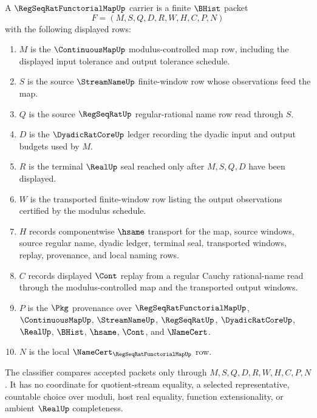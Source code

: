\begin{definition}
\label{def:regseqrat-functorial-map-carrier}
A $\RegSeqRatFunctorialMapUp$ carrier is a finite $\BHist$ packet
$$
F=(M,S,Q,D,R,W,H,C,P,N)
$$
with the following displayed rows:
\begin{enumerate}
\item $M$ is the $\ContinuousMapUp$ modulus-controlled map row, including the displayed input tolerance and output tolerance schedule.
\item $S$ is the source $\StreamNameUp$ finite-window row whose observations feed the map.
\item $Q$ is the source $\RegSeqRatUp$ regular-rational name row read through $S$.
\item $D$ is the $\DyadicRatCoreUp$ ledger recording the dyadic input and output budgets used by $M$.
\item $R$ is the terminal $\RealUp$ seal reached only after $M,S,Q,D$ have been displayed.
\item $W$ is the transported finite-window row listing the output observations certified by the modulus schedule.
\item $H$ records componentwise $\hsame$ transport for the map, source windows, source regular name, dyadic ledger, terminal seal, transported windows, replay, provenance, and local naming rows.
\item $C$ records displayed $\Cont$ replay from a regular Cauchy rational-name read through the modulus-controlled map and the transported output windows.
\item $P$ is the $\Pkg$ provenance over $\RegSeqRatFunctorialMapUp$, $\ContinuousMapUp$, $\StreamNameUp$, $\RegSeqRatUp$, $\DyadicRatCoreUp$, $\RealUp$, $\BHist$, $\hsame$, $\Cont$, and $\NameCert$.
\item $N$ is the local $\NameCert_{\RegSeqRatFunctorialMapUp}$ row.
\end{enumerate}
The classifier compares accepted packets only through $M,S,Q,D,R,W,H,C,P,N$. It has no coordinate for quotient-stream equality, a selected representative, countable choice over moduli, host real equality, function extensionality, or ambient $\RealUp$ completeness.
\end{definition}

